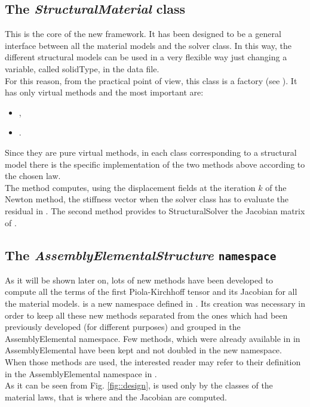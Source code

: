 \subsection{The \textit{StructuralMaterial} class} This is the core of
the new framework. It has been designed to be a general interface
between all the material models and the solver class. In this way, the
different structural models can be used in a very flexible way just
changing a variable, called solidType, in the data file.\\ For this
reason, from the practical point of view, this class is a factory (see
\cite{DesignPattern}). It has only virtual methods and the most
important are:
\begin{itemize}
  \item {},
  \item {}.
\end{itemize} Since they are pure virtual methods, in each class
corresponding to a structural model there is the specific
implementation of the two methods above according to the chosen law.\\
The method  computes, using the displacement
fields at the iteration $k$ of the Newton method, the stiffness vector
when the solver class has to evaluate the residual in
. The second method provides to StructuralSolver
the Jacobian matrix of \Piola.\\

\subsection{The \textit{AssemblyElementalStructure}
\texttt{namespace}} As it will be shown later on, lots of new methods
have been developed to compute all the terms of the first
Piola-Kirchhoff tensor and its Jacobian for all the material models.
\AES is a new namespace defined in \LV. Its creation was necessary in
order to keep all these new methods separated from the ones which had
been previously developed (for different purposes) and grouped in the
AssemblyElemental namespace. Few methods, which were already available
in \LV in AssemblyElemental have been kept and not doubled in the new
namespace. When those methods are used, the interested reader may
refer to their definition in the AssemblyElemental namespace in
.\\ As it can be seen from
Fig. \ref{fig::design}, \AES is used only by the classes of the
material laws, that is where \Piola and the Jacobian are computed.



